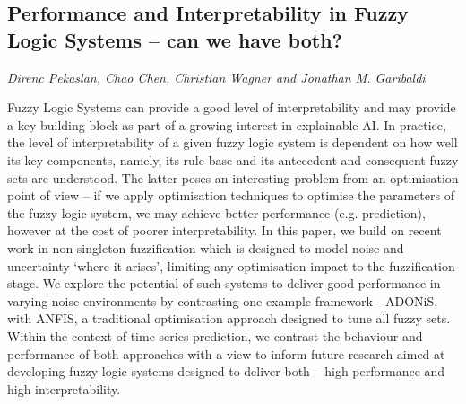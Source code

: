 \documentclass[../booklet.tex]{subfiles}
\begin{document}
\subsection[Performance and Interpretability in Fuzzy Logic Systems – can we have both?. {\it Direnc Pekaslan, Chao Chen, Christian Wagner and Jonathan M. Garibaldi}]{Performance and Interpretability in Fuzzy Logic Systems – can we have both?}
   

\begin{center}
  {\it Direnc Pekaslan, Chao Chen, Christian Wagner and Jonathan M. Garibaldi}
\end{center}




Fuzzy Logic Systems can provide a good level of interpretability and may provide a key building block as part of a growing interest in explainable AI. In practice, the level of interpretability of a given fuzzy logic system is dependent on how well its key components, namely, its rule base and its antecedent and consequent fuzzy sets are understood. The latter poses an interesting problem from an optimisation point of view -- if we apply optimisation techniques to optimise the parameters of the fuzzy logic system, we may achieve better performance (e.g. prediction), however at the cost of poorer interpretability. In this paper, we build on recent work in non-singleton fuzzification which is designed to model noise and uncertainty `where it arises', limiting any optimisation impact to the fuzzification stage. We explore the potential of such systems to deliver good performance in varying-noise environments by contrasting one example framework - ADONiS, with ANFIS, a traditional optimisation approach designed to tune all fuzzy sets. Within the context of time series prediction, we contrast the behaviour and performance of both approaches with a view to inform future research aimed at developing fuzzy logic systems designed to deliver both -- high performance and high interpretability. 

\end{document}
